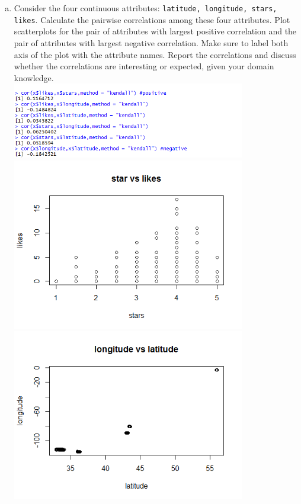 \documentclass[11pt]{article}
\begin{document}
\begin{enumerate}[(a)]
\item  
Consider the four continuous attributes: \texttt{latitude, longitude, stars, likes}. Calculate the pairwise correlations among these four attributes. 
Plot scatterplots for the pair of attributes with largest positive correlation and the pair of attributes with largest negative correlation. 
Make sure to label both axis of the plot with the attribute names. Report the correlations and discuss whether the correlations are interesting or expected, given your domain knowledge.\\
\includegraphics[width=4in]{cor_result.png} \\
\includegraphics[width=4in]{star vs likes.png} \\
\includegraphics[width=4in]{longitude vs latitude.png}\\

\end{enumerate}
\end{document}
